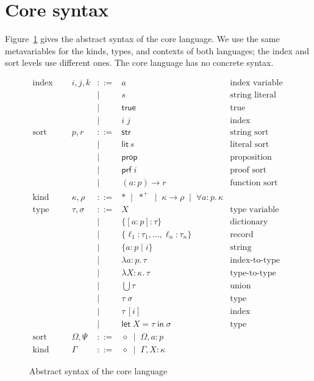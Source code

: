 \documentclass[11pt]{article}
\newcommand{\kw}[1]{\mathsf{#1}}
\newcommand{\str}{\kw{str}}
\newcommand{\lit}[1]{\kw{lit}\,#1}
\newcommand{\prop}{\kw{prop}}
\newcommand{\prf}[1]{\kw{prf}\;#1}
\newcommand{\true}{\kw{true}}
\newcommand{\letin}[3]{\kw{let}\;#1 = #2\;\kw{in}\;#3}
\newcommand{\proper}{\ast}
\newcommand{\populated}{\ast^{+}}
\newcommand{\kall}[3]{\forall #1 : #2.\,#3}
\newcommand{\dict}[3]{\{[#1 : #2] : #3\}}
\newcommand{\refine}[3]{\{#1 : #2 \mid #3\}}
\newcommand{\iabs}[3]{\lambda #1 : #2.\,#3}
\newcommand{\tabs}[3]{\lambda #1 : #2.\,#3}
\newcommand{\union}[1]{\textstyle\bigcup #1}
\newcommand{\iapp}[2]{#1\,[#2]}
\newcommand{\emptyctx}{\diamond}
\theoremstyle{remark}
\begin{document}
\FloatBarrier
\section{Core syntax}
\label{sec:core-syntax}

Figure~\ref{fig:core-syntax} gives the abstract syntax of the core language. We use the same
metavariables for the kinds, types, and contexts of both languages; the index and sort levels use
different ones. The core language has no concrete syntax.

\begin{figure}[!htbp]
\[
\begin{array}{llcll}
\text{index} & i, j, k & ::= & a & \text{index variable} \\
  & & \mid & s & \text{string literal} \\
  & & \mid & \true & \text{true proposition} \\
  & & \mid & i\;j & \text{index application} \\[4pt]
\text{sort} & p, r & ::= & \str & \text{string sort} \\
  & & \mid & \lit{s} & \text{literal sort} \\
  & & \mid & \prop & \text{proposition sort} \\
  & & \mid & \prf{i} & \text{proof sort} \\
  & & \mid & (a : p) \to r & \text{function sort} \\[4pt]
\text{kind} & \kappa, \rho & ::= & \proper \;\mid\; \populated \;\mid\; \kappa \to \rho
  \;\mid\; \kall{a}{p}{\kappa} & \\[4pt]
\text{type} & \tau, \sigma & ::= & X & \text{type variable} \\
  & & \mid & \dict{a}{p}{\tau} & \text{dictionary} \\
  & & \mid & \{\ell_1 : \tau_1, \ldots, \ell_n : \tau_n\} & \text{record} \\
  & & \mid & \refine{a}{p}{i} & \text{string refinement} \\
  & & \mid & \iabs{a}{p}{\tau} & \text{index-to-type abstraction} \\
  & & \mid & \tabs{X}{\kappa}{\tau} & \text{type-to-type abstraction} \\
  & & \mid & \union{\tau} & \text{union} \\
  & & \mid & \tau\;\sigma & \text{type application} \\
  & & \mid & \iapp{\tau}{i} & \text{index application} \\
  & & \mid & \letin{X}{\tau}{\sigma} & \text{type definition} \\[4pt]
\text{sort context} & \Omega, \Psi & ::= & \emptyctx \;\mid\; \Omega, a : p & \\[2pt]
\text{kind context} & \Gamma & ::= & \emptyctx \;\mid\; \Gamma, X : \kappa &
\end{array}
\]
\caption{Abstract syntax of the core language}
\label{fig:core-syntax}
\end{figure}
\end{document}

